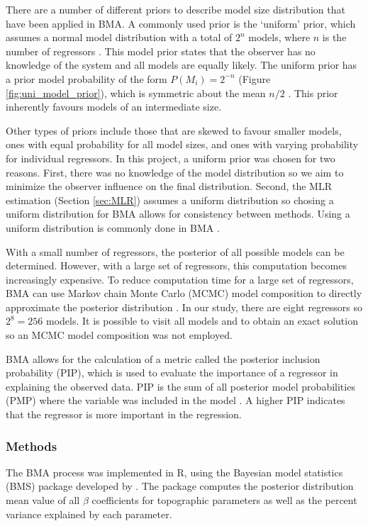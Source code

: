\documentclass[12pt]{article}
\begin{document}
There are a number of different priors to describe model size distribution that have been applied in BMA. A commonly used prior is the `uniform' prior, which assumes a normal model distribution with a total of $2^n$ models, where $n$ is the number of regressors \citep{Wasserman2000}.  This model prior states that the observer has no knowledge of the system and all models are equally likely. The uniform prior has a prior model probability of the form $P(M_i)=2^{-n}$ (Figure \ref{fig:uni_model_prior}), which is symmetric about the mean $n/2$ \citep{Zeugner2015}. This prior inherently favours models of an intermediate size. 

Other types of priors include those that are skewed to favour smaller models, ones with equal probability for all model sizes, and ones with varying probability for individual regressors. In this project, a uniform prior was chosen for two reasons. First, there was no knowledge of the model distribution so we aim to minimize the observer influence on the final distribution. Second, the MLR estimation (Section \ref{sec:MLR}) assumes a uniform distribution so chosing a uniform distribution for BMA allows for consistency between methods. Using a uniform distribution is commonly done in BMA \citep{Wasserman2000}.

With a small number of regressors, the posterior of all possible models can be determined. However, with a large set of regressors, this computation becomes increasingly expensive. To reduce computation time for a large set of regressors, BMA can use Markov chain Monte Carlo (MCMC) model composition to directly approximate the posterior distribution \citep{Wasserman2000}. In our study, there are eight regressors so $2^8 = 256$ models. It is possible to visit all models and to obtain an exact solution so an MCMC model composition was not employed. 

BMA allows for the calculation of a metric called the posterior inclusion probability (PIP), which is used to evaluate the importance of a regressor in explaining the observed data. PIP is the sum of all posterior model probabilities (PMP) where the variable was included in the model \citep{Zeugner2015}. A higher PIP indicates that the regressor is more important in the regression.  

\subsubsection{Methods}

The BMA process was implemented in R, using the Bayesian model statistics (BMS) package developed by \cite{Zeugner2015}. The package computes the posterior distribution mean value of all $\beta$ coefficients for topographic parameters as well as the percent variance explained by each parameter.
\end{document}
